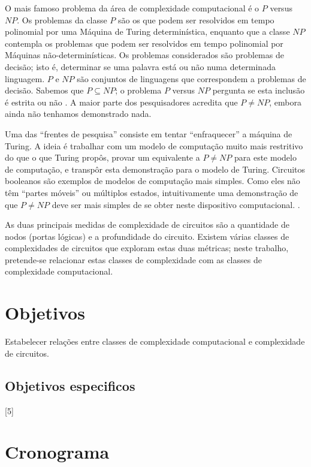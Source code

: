 \documentclass[12pt]{article}
\begin{document}
    O mais famoso problema da área de complexidade computacional é o $P$ versus $NP$.
    Os problemas da classe $P$ são os que podem ser resolvidos em tempo polinomial
    por uma Máquina de Turing determinística, enquanto que a classe $NP$ contempla
    os problemas que podem ser resolvidos em tempo polinomial por Máquinas
    não-determinísticas.
    Os problemas considerados são problemas de decisão; isto é, determinar se uma
    palavra está ou não numa determinada linguagem. $P$ e $NP$ são conjuntos de
    linguagens que correspondem a problemas de decisão. Sabemos que $P \subseteq NP$;
    o problema $P$ versus $NP$ pergunta se esta inclusão é estrita ou não \cite{Sipser2006}.
    A maior parte dos pesquisadores acredita que $P \neq NP$,
    embora ainda não tenhamos demonstrado nada.

    Uma das ``frentes de pesquisa'' consiste em tentar ``enfraquecer'' a máquina de Turing.
    A ideia é trabalhar com um modelo de computação muito
    mais restritivo do que o que Turing propôs,
    provar um equivalente a $P \neq NP$ para este modelo de computação,
    e transpôr esta demonstração para o modelo de Turing.
    Circuitos booleanos são exemplos de modelos de computação mais simples.
    Como eles não têm ``partes móveis'' ou múltiplos estados,
    intuitivamente uma demonstração de que $P \neq NP$ deve ser
    mais simples de se obter neste dispositivo computacional. \cite{Hastad1987}.

    As duas principais medidas de complexidade de circuitos são a quantidade de
    nodos (portas lógicas) e a profundidade do circuito.
    Existem várias classes de complexidades de circuitos
    que exploram estas duas métricas;
    neste trabalho, pretende-se relacionar estas classes de complexidade
    com as classes de complexidade computacional.

\section{Objetivos}

    Estabelecer relações entre classes de complexidade computacional
    e complexidade de circuitos.

\subsection{Objetivos especificos}

    [5]

\section{Cronograma}
\end{document}
